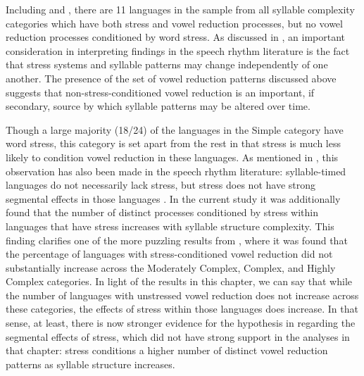   Including  and , there are 11 languages in the sample from all syllable complexity categories which have both stress and vowel reduction processes, but no vowel reduction processes conditioned by word stress. As discussed in , an important consideration in interpreting findings in the speech rhythm literature is the fact that stress systems and syllable patterns may change independently of one another. The presence of the set of vowel reduction patterns discussed above suggests that non-stress-conditioned vowel reduction is an important, if secondary, source by which syllable patterns may be altered over time.

  Though a large majority (18/24) of the languages in the Simple category have word stress, this category is set apart from the rest in that stress is much less likely to condition vowel reduction in these languages. As mentioned in , this observation has also been made in the speech rhythm literature: syllable-timed languages do not necessarily lack stress, but stress does not have strong segmental effects in those languages \citep{Auer1993}. In the current study it was additionally found that the number of distinct processes conditioned by stress within languages that have stress increases with syllable structure complexity. This finding clarifies one of the more puzzling results from , where it was found that the percentage of languages with stress-conditioned vowel reduction did not substantially increase across the Moderately Complex, Complex, and Highly Complex categories. In light of the results in this chapter, we can say that while the number of languages with unstressed vowel reduction does not increase across these categories, the effects of stress within those languages does increase. In that sense, at least, there is now stronger evidence for the hypothesis in  regarding the segmental effects of stress, which did not have strong support in the analyses in that chapter: stress conditions a higher number of distinct vowel reduction patterns as syllable structure increases.

